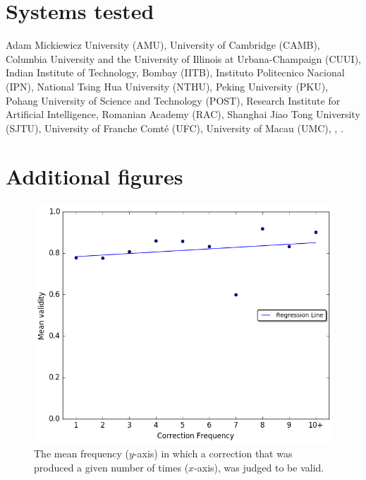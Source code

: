 \documentclass[letterpaper, 11pt]{article}
\begin{document}
\section{Systems tested}\label{ap:abbr}
 Adam Mickiewicz University (AMU),
 University of Cambridge (CAMB), Columbia University and the University of Illinois at Urbana-Champaign (CUUI),
 Indian Institute of Technology, Bombay (IITB), Instituto Politecnico Nacional (IPN),
 National Tsing Hua University (NTHU), Peking University (PKU), Pohang University of Science and Technology (POST),
 Research Institute for Artificial Intelligence, Romanian Academy (RAC), Shanghai Jiao Tong University (SJTU),
 University of Franche Comt\'{e} (UFC), University of Macau (UMC), ,  .
\section{Additional figures}
\begin{figure}[h!]
	\vspace{-.3cm}
	\includegraphics[width=0.9\columnwidth]{IAA_confirmation_frequency}
	\caption{The mean frequency ($y$-axis) in which a correction that was produced
		a given number of times ($x$-axis), was judged to be valid.
		} \label{fig:validity_judgements}
		\vspace{-0.3cm}
		\end{figure}
\end{document}

